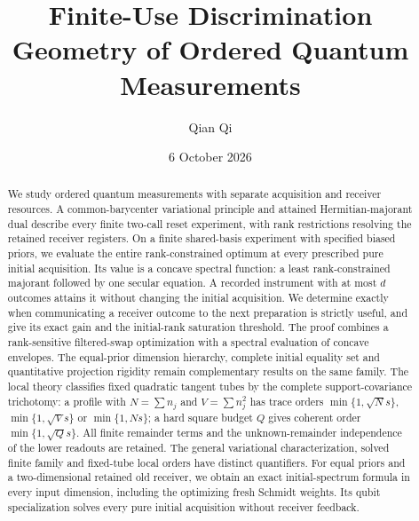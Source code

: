 \documentclass[11pt]{amsart}
\title[Finite-use discrimination geometry]{Finite-Use Discrimination Geometry of Ordered Quantum Measurements}
\author{Qian Qi}
\date{6 October 2026}
\numberwithin{equation}{section}
\theoremstyle{definition}\newtheorem{definition}[theorem]{Definition}
\theoremstyle{remark}\newtheorem{remark}[theorem]{Remark}
\begin{document}
\raggedbottom
\begin{abstract}
We study ordered quantum measurements with separate acquisition and
receiver resources.  A common-barycenter variational principle and
attained Hermitian-majorant dual describe every finite two-call reset
experiment, with rank restrictions resolving the retained receiver
registers.  On a finite shared-basis experiment with specified biased priors, we evaluate the entire
rank-constrained optimum at every prescribed pure initial acquisition.
Its value is a concave spectral function: a least rank-constrained
majorant followed by one secular equation.  A recorded instrument with
at most $d$ outcomes attains it without changing the initial acquisition.
We determine exactly when communicating a receiver outcome to the next
preparation is strictly useful, and give its exact gain and the
initial-rank saturation threshold.  The proof combines a rank-sensitive
filtered-swap optimization with a spectral evaluation of concave
envelopes.  The equal-prior dimension hierarchy, complete initial
equality set and quantitative projection rigidity remain complementary
results on the same family.  The local theory classifies fixed quadratic
tangent tubes by the complete support-covariance trichotomy: a profile
with $N=\sum n_j$ and $V=\sum n_j^2$ has trace orders
$\min\{1,\sqrt Ns\}$, $\min\{1,\sqrt Vs\}$ or $\min\{1,Ns\}$;
a hard square budget $Q$ gives coherent order $\min\{1,\sqrt Qs\}$.
All finite remainder terms and the unknown-remainder independence of the
lower readouts are retained.  The general variational characterization,
solved finite family and fixed-tube local orders have distinct quantifiers.
For equal priors and a two-dimensional retained old receiver, we obtain
an exact initial-spectrum formula in every input dimension, including
the optimizing fresh Schmidt weights.  Its qubit specialization solves
every pure initial acquisition without receiver feedback.
\end{abstract}
\maketitle























\end{document}
